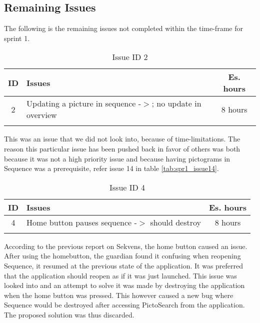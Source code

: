 \subsection{Remaining Issues}\label{subsec:remain_issues}
The following is the remaining issues not completed within the time-frame for sprint 1.

\begin{longtable} { | c | p{12cm} | c | } 
\hline
	ID 	&	Issues	&		 Es. hours \\\hline
	2	&	Updating a picture in sequence -$>$; no update in overview	&	8 hours	\\\hline
	\caption{Issue ID 2}
\label{tab:spr1_overviewupdate}
\end{longtable}
This was an issue that we did not look into, because of time-limitations. The reason this particular issue has been pushed back in favor of others was both because it was not a high priority issue and because having pictograms in Sequence was a prerequisite, refer issue 14 in table \ref{tab:spr1_issue14}. 

\begin{longtable} { | c | p{12cm} | c | } 
\hline
	ID 	&	Issues	&		 Es. hours \\\hline
	4	&	Home button pauses sequence -$>$ should destroy 	&	8 hours	\\\hline
	\caption{Issue ID 4}
\label{tab:spr1_homebtndestroy}
\end{longtable}

According to the previous report on Sekvens\citep{Zebra}, the home button caused an issue. After using the homebutton, the guardian found it confusing when reopening Sequence, it resumed at the previous state of the application. It was preferred that the application should reopen as if it was just launched. This issue was looked into and an attempt to solve it was made by destroying the application when the home button was pressed. This however caused a new bug where Sequence would be destroyed after accessing PictoSearch from the application. The proposed solution was thus discarded.